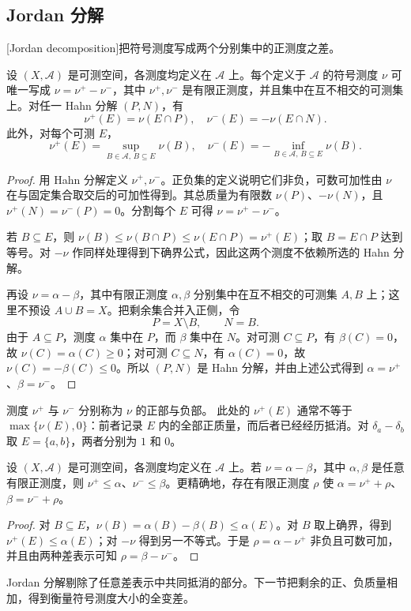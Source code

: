 \subsection{Jordan 分解}
\label{b1:subsec:060103}

[Jordan decomposition]把符号测度写成两个分别集中的正测度之差。

\begin{theorem}[Jordan 分解]\label{b1:thm:jordan-decomposition}
设 \((X,\mathcal A)\) 是可测空间，各测度均定义在 \(\mathcal A\) 上。每个定义于 \(\mathcal A\) 的符号测度 \(\nu\) 可唯一写成 \(\nu=\nu^+-\nu^-\)，其中 \(\nu^+,\nu^-\) 是有限正测度，并且集中在互不相交的可测集上。对任一 Hahn 分解 \((P,N)\)，有
\[
\nu^+(E)=\nu(E\cap P),\quad \nu^-(E)=-\nu(E\cap N).
\]
此外，对每个可测 \(E\)，
\[
\nu^+(E)=\sup_{B\in\mathcal A,\,B\subseteq E}\nu(B),\quad
\nu^-(E)=-\inf_{B\in\mathcal A,\,B\subseteq E}\nu(B).
\]
\end{theorem}
\begin{proof}
用 Hahn 分解定义 \(\nu^+,\nu^-\)。正负集的定义说明它们非负，可数可加性由 \(\nu\) 在与固定集合取交后的可加性得到。其总质量为有限数 \(\nu(P)\)、\(-\nu(N)\)，且 \(\nu^+(N)=\nu^-(P)=0\)。分割每个 \(E\) 可得 \(\nu=\nu^+-\nu^-\)。

若 \(B\subseteq E\)，则 \(\nu(B)\leq\nu(B\cap P)\leq\nu(E\cap P)=\nu^+(E)\)；取 \(B=E\cap P\) 达到等号。对 \(-\nu\) 作同样处理得到下确界公式，因此这两个测度不依赖所选的 Hahn 分解。

再设 \(\nu=\alpha-\beta\)，其中有限正测度 \(\alpha,\beta\) 分别集中在互不相交的可测集 \(A,B\) 上；这里不预设 \(A\cup B=X\)。把剩余集合并入正侧，令
\[
P=X\setminus B,\qquad N=B.
\]
由于 \(A\subseteq P\)，测度 \(\alpha\) 集中在 \(P\)，而 \(\beta\) 集中在 \(N\)。对可测 \(C\subseteq P\)，有 \(\beta(C)=0\)，故 \(\nu(C)=\alpha(C)\geq0\)；对可测 \(C\subseteq N\)，有 \(\alpha(C)=0\)，故 \(\nu(C)=-\beta(C)\leq0\)。所以 \((P,N)\) 是 Hahn 分解，并由上述公式得到 \(\alpha=\nu^+\)、\(\beta=\nu^-\)。
\end{proof}

测度 \(\nu^+\) 与 \(\nu^-\) 分别称为 \(\nu\) 的正部与负部。
此处的 \(\nu^+(E)\) 通常不等于 \(\max\{\nu(E),0\}\)：前者记录 \(E\) 内的全部正质量，而后者已经经历抵消。对 \(\delta_a-\delta_b\) 取 \(E=\{a,b\}\)，两者分别为 \(1\) 和 \(0\)。

\begin{proposition}\label{b1:prop:jordan-minimality}
设 \((X,\mathcal A)\) 是可测空间，各测度均定义在 \(\mathcal A\) 上。若 \(\nu=\alpha-\beta\)，其中 \(\alpha,\beta\) 是任意有限正测度，则 \(\nu^+\leq\alpha\)、\(\nu^-\leq\beta\)。更精确地，存在有限正测度 \(\rho\) 使 \(\alpha=\nu^++\rho\)、\(\beta=\nu^-+\rho\)。
\end{proposition}
\begin{proof}
对 \(B\subseteq E\)，\(\nu(B)=\alpha(B)-\beta(B)\leq\alpha(E)\)。对 \(B\) 取上确界，得到 \(\nu^+(E)\leq\alpha(E)\)；对 \(-\nu\) 得到另一不等式。于是 \(\rho=\alpha-\nu^+\) 非负且可数可加，并且由两种差表示可知 \(\rho=\beta-\nu^-\)。
\end{proof}

Jordan 分解剔除了任意差表示中共同抵消的部分。下一节把剩余的正、负质量相加，得到衡量符号测度大小的全变差。
